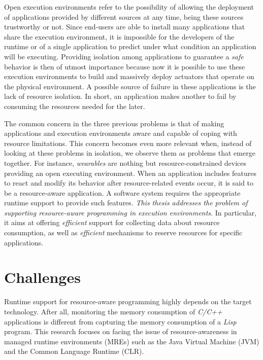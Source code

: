 Open execution environments refer to the possibility of allowing the deployment of applications provided by different sources at any time, being these sources trustworthy or not.
Since end-users are able to install many applications that share the execution environment, it is impossible for the developers of the runtime or of a single application to predict under what condition an application will be executing.
Providing isolation among applications to guarantee a \textit{safe} behavior is then of utmost importance because now it is possible to use these execution environments to build and massively deploy actuators that operate on the physical environment.
A possible source of failure in these applications is the lack of resource isolation.
In short, an application makes another to fail by consuming the resources needed for the later.

The common concern in the three previous problems is that of making applications and execution environments aware and capable of coping with resource limitations.
This concern becomes even more relevant when, instead of looking at these problems in isolation, we observe them as problems that emerge together.
For instance, \textit{wearables} are nothing but resource-constrained devices providing an open executing environment. 
When an application includes features to react and modify its behavior after resource-related events occur, it is said to be a resource-aware application.
A software system requires the appropriate runtime support to provide such features.   
\textit{This thesis addresses the problem of supporting resource-aware programming in execution environments}.
In particular, it aims at offering \textit{efficient} support for collecting data about resource consumption, as well as \textit{efficient} mechanisms to reserve resources for specific applications.

\section{Challenges}

Runtime support for resource-aware programming highly depends on the target technology.
After all, monitoring the memory consumption of \textit{C/C++} applications is different from capturing the memory consumption of a \textit{Lisp} program.
This research focuses on facing the issue of resource-awareness in managed runtime environments (MREs) such as the Java Virtual Machine (JVM) and the Common Language Runtime (CLR).

